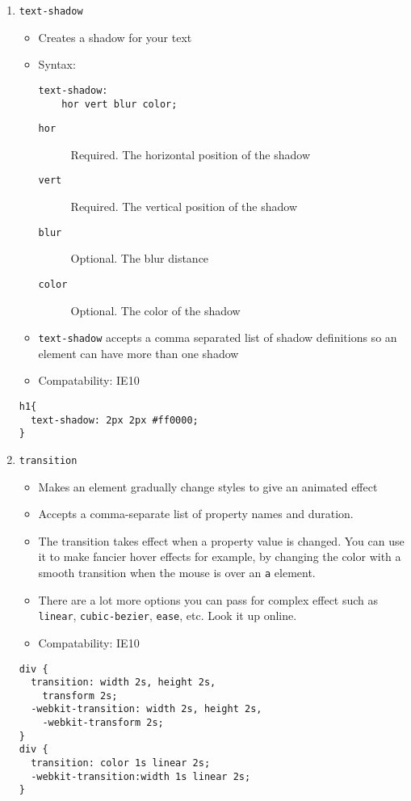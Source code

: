 \documentclass[10pt, twocolumn]{article}
\begin{document}
\begin{enumerate}
\item \texttt{text-shadow}
\begin{itemize}
\item Creates a shadow for your text
\item Syntax:
\begin{lstlisting}[frame=single]
text-shadow: 
    hor vert blur color;
\end{lstlisting}
\begin{description}
\item[\texttt{hor}] Required.  The horizontal position of the shadow
\item[\texttt{vert}] Required.  The vertical position of the shadow
\item[\texttt{blur}] Optional.  The blur distance
\item[\texttt{color}] Optional.  The color of the shadow
\end{description}
\item \texttt{text-shadow} accepts a comma separated list of shadow definitions so an element can have more than one shadow
\item Compatability: IE10
\end{itemize}
\begin{lstlisting}[frame=single]
h1{
  text-shadow: 2px 2px #ff0000;
}
\end{lstlisting}
\item \texttt{transition}
\begin{itemize}
\item Makes an element gradually change styles to give an animated effect
\item Accepts a comma-separate list of property names and duration.
\item The transition takes effect when a property value is changed.  You can use it to make fancier hover effects for example, by changing the color with a smooth transition when the mouse is over an \texttt{a} element.
\item There are a lot more options you can pass for complex effect such as \texttt{linear}, \texttt{cubic-bezier}, \texttt{ease}, etc.  Look it up online.
\item Compatability: IE10
\end{itemize}
\begin{lstlisting}[frame=single]
div {
  transition: width 2s, height 2s,
    transform 2s;
  -webkit-transition: width 2s, height 2s, 
    -webkit-transform 2s;
}
div {
  transition: color 1s linear 2s;
  -webkit-transition:width 1s linear 2s;
}
\end{lstlisting}
\end{enumerate}
\end{document}
